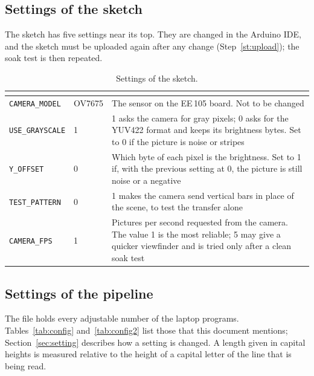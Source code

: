 \subsection*{Settings of the sketch}

The sketch  has five settings near its top. They are changed in the Arduino
IDE, and the sketch must be uploaded again after any change (Step~\ref{st:upload}); the soak
test is then repeated.

\begin{table}[H]
\centering
\begin{tabular}{L{3.0cm}C{1.5cm}L{6.6cm}}
\toprule
{} &  &  \\
\midrule
\texttt{CAMERA\_MODEL} & OV7675 & The sensor on the EE\,105 board. Not to be changed \\
\texttt{USE\_GRAYSCALE} & 1 & 1 asks the camera for gray pixels; 0 asks for the YUV422 format and
  keeps its brightness bytes. Set to 0 if the picture is noise or stripes \\
\texttt{Y\_OFFSET} & 0 & Which byte of each pixel is the brightness. Set to 1 if, with the
  previous setting at 0, the picture is still noise or a negative \\
\texttt{TEST\_PATTERN} & 0 & 1 makes the camera send vertical bars in place of the scene, to
  test the transfer alone \\
\texttt{CAMERA\_FPS} & 1 & Pictures per second requested from the camera. The value 1 is the
  most reliable; 5 may give a quicker viewfinder and is tried only after a clean soak test \\
\bottomrule
\end{tabular}
\caption{Settings of the sketch.}
\label{tab:sketchsettings}
\end{table}

\subsection*{Settings of the pipeline}

The file  holds every adjustable number of the laptop programs.
Tables~\ref{tab:config} and~\ref{tab:config2} list those that this document mentions;
Section~\ref{sec:setting} describes how a setting is changed. A length given in capital heights is measured relative to
the height of a capital letter of the line that is being read.

